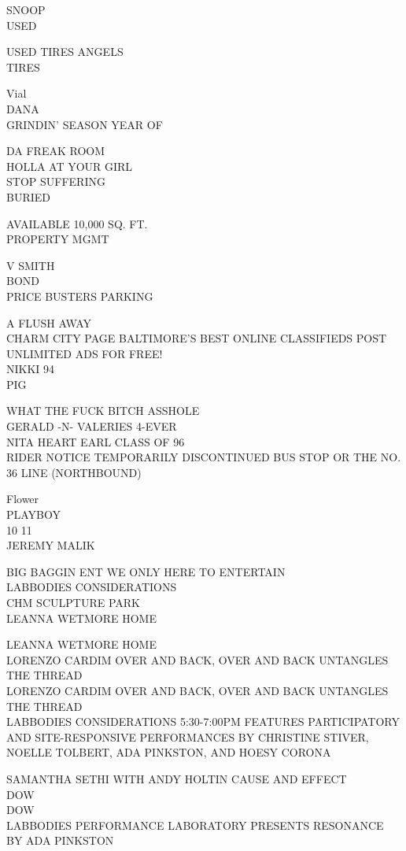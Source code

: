 \documentclass[10pt,letterpaper]{article}
\begin{document}
SNOOP\\
USED

USED TIRES ANGELS\\
TIRES

Vial\\
DANA\\
GRINDIN' SEASON YEAR OF

DA FREAK ROOM\\
HOLLA AT YOUR GIRL\\
STOP SUFFERING\\
BURIED

AVAILABLE 10,000 SQ. FT.\\
PROPERTY MGMT

V SMITH\\
BOND\\
PRICE BUSTERS PARKING

A FLUSH AWAY\\
CHARM CITY PAGE BALTIMORE'S BEST ONLINE CLASSIFIEDS POST UNLIMITED ADS FOR FREE!\\
NIKKI 94\\
PIG

WHAT THE FUCK BITCH ASSHOLE\\
GERALD {-}N{-} VALERIES 4{-}EVER\\
NITA HEART EARL CLASS OF 96\\
RIDER NOTICE TEMPORARILY DISCONTINUED BUS STOP OR THE NO. 36 LINE (NORTHBOUND)

Flower\\
PLAYBOY\\
10 11\\
JEREMY MALIK

BIG BAGGIN ENT WE ONLY HERE TO ENTERTAIN\\
LABBODIES CONSIDERATIONS\\
CHM SCULPTURE PARK\\
LEANNA WETMORE HOME

LEANNA WETMORE HOME\\
LORENZO CARDIM OVER AND BACK, OVER AND BACK UNTANGLES THE THREAD\\
LORENZO CARDIM OVER AND BACK, OVER AND BACK UNTANGLES THE THREAD\\
LABBODIES CONSIDERATIONS 5:30{-}7:00PM FEATURES PARTICIPATORY AND SITE{-}RESPONSIVE PERFORMANCES BY CHRISTINE STIVER, NOELLE TOLBERT, ADA PINKSTON, AND HOESY CORONA

SAMANTHA SETHI WITH ANDY HOLTIN CAUSE AND EFFECT\\
DOW\\
DOW\\
LABBODIES PERFORMANCE LABORATORY PRESENTS RESONANCE BY ADA PINKSTON
\end{document}
